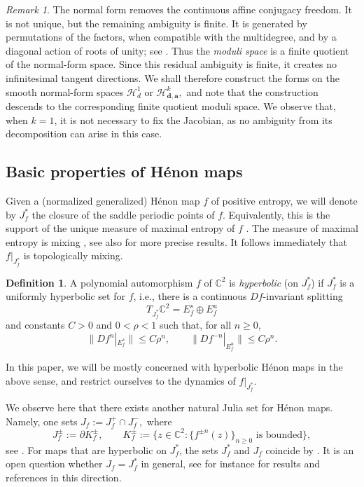 \documentclass[11pt]{amsart}
\theoremstyle{plain}
\theoremstyle{definition}
\newtheorem{defn}[thm]{Definition}
\theoremstyle{remark}
\newtheorem{rmk}[thm]{Remark}
\begin{document}
\begin{rmk}\label{rmk:finite-conjugacy}
The normal form removes the continuous affine conjugacy freedom. It is not
unique, but the remaining ambiguity is finite.
It
is generated by permutations
of the factors, when compatible with the multidegree, and by a diagonal action
of roots of unity; see \cite[Section 1.2]{CD26Henon}. Thus the {\it moduli space} is a finite quotient of the
normal-form space. Since this residual ambiguity is finite, it creates no
infinitesimal tangent directions. We shall therefore construct the forms on the
smooth normal-form spaces
$\mathcal H^1_d$ or
$\mathcal H^k_{\mathbf d,\mathbf a},
$
and note that the construction descends to the corresponding finite quotient
moduli space.
We observe that, 
when $k=1$, it is not necessary to fix the Jacobian, as no
ambiguity from its decomposition can arise in this case.
\end{rmk}


\subsection{Basic properties of H\'enon maps}
Given a (normalized generalized)
H\'enon map $f$ of positive entropy,
we will denote by
$J_f^\ast$
the closure of the saddle periodic points of
$f$. Equivalently, this is the support of the unique measure of maximal entropy of $f$ \cite{BLSa,BLS93b}.
The measure of maximal entropy is mixing 
\cite{BS3}, see also \cite{BLSa,Dinh05, BD24} 
for more precise results.
It follows immediately that $f|_{J^\ast_f}$ is topologically mixing.

\begin{defn}
A polynomial automorphism $f$ of $\mathbb C^2$ is {\it hyperbolic}
(on $J_f^\ast$)
if $J_f^\ast$ is a uniformly hyperbolic set for $f$, i.e.,
there is a continuous $Df$-invariant splitting
$$
T_{J_f^\ast}\mathbb C^2=E_f^s\oplus E_f^u
$$
and constants $C>0$ and $0<\rho<1$ such that, for all $n\ge 0$,
$$
        \|Df^n|_{E_f^s}\|\le C\rho^n,
        \qquad
        \|Df^{-n}|_{E_f^u}\|\le C\rho^n.
$$
\end{defn}

In this paper, we will be mostly concerned with hyperbolic Hénon maps in the above sense, and  restrict ourselves to the 
dynamics of  $f|_{J^{\ast}_f}$.

\medskip

We observe here that there exists
another natural Julia set
for Hénon maps. Namely, one sets
$
J_f:=J_f^+\cap J_f^-,
$
where
$$
J_f^\pm:=\partial K_f^\pm,
\qquad
K_f^\pm:=\{z\in\mathbb C^2:\{f^{\pm n}(z)\}_{n\ge 0}\text{ is bounded}\},
$$
see \cite{BS91I}.
For maps that are hyperbolic on $J^\ast_f$,
the sets
$J^\ast_f$ and $J_f$ coincide by \cite{Dujardin20}.
It is an open question whether 
$J_f=J_f^\ast$ in general,
see for instance \cite{HenonOpenProblems} for results and references in this direction.
\end{document}

